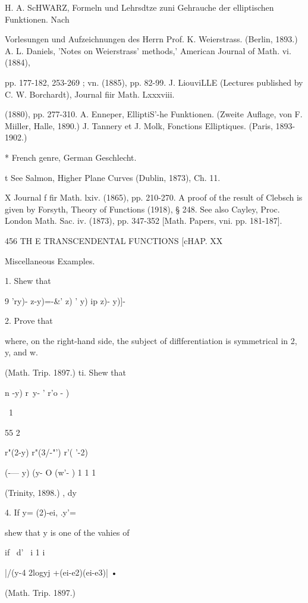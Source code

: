 {H. A. ScHWARZ, Formeln und Lehrsdtze zuni Gehrauche der elliptischen
Funktionen. Nach

Vorlesungen und Aufzeichnungen des Herrn Prof. K. Weierstrass.
(Berlin, 1893.) A. L. Daniels, 'Notes on Weierstrass' methods,'
American Journal of Math. vi. (1884),

pp. 177-182, 253-269 ; vn. (1885), pp. 82-99. J. LiouviLLE (Lectures
published by C. W. Borchardt), Journal fiir Math. Lxxxviii.

(1880), pp. 277-310. A. Enneper, ElliptiS'-he Funktionen. (Zweite
Auflage, von F. Miiller, Halle, 1890.) J. Tannery et J. Molk,
Fonctions Elliptiques. (Paris, 1893-1902.)

* French genre, German Geschlecht.

t See Salmon, Higher Plane Curves (Dublin, 1873), Ch. 11.

X Journal f fir Math. lxiv. (1865), pp. 210-270. A proof of the result
of Clebsch is given by Forsyth, Theory of Functions (1918), § 248. See
also Cayley, Proc. London Math. Sac. iv. (1873), pp. 347-352 [Math.
Papers, vni. pp. 181-187].



456 TH E TRANSCENDENTAL FUNCTIONS [cHAP. XX

Miscellaneous Examples.

1. Shew that

9 'ry)- z-y)=-\&' z) ' y) ip z)- y)]-\

2. Prove that

where, on the right-hand side, the subject of diflferentiation is
symmetrical in 2, y, and w.

(Math. Trip. 1897.) ti. Shew that



n -y) r\ y- ' r'o - )



\ 1



55 2



r"(2-y) r"(3/-"') r'( '-2)

  (-— y) (y- O (w'- ) 1 1 1

(Trinity, 1898.) , dy



4. If y= (2)-ei, .y'=

shew that y is one of the vahies of

if \ d' \ i 1 i

|/(y-4 2logyj +(ei-e2)(ei-e3)| •

(Math. Trip. 1897.)

}
